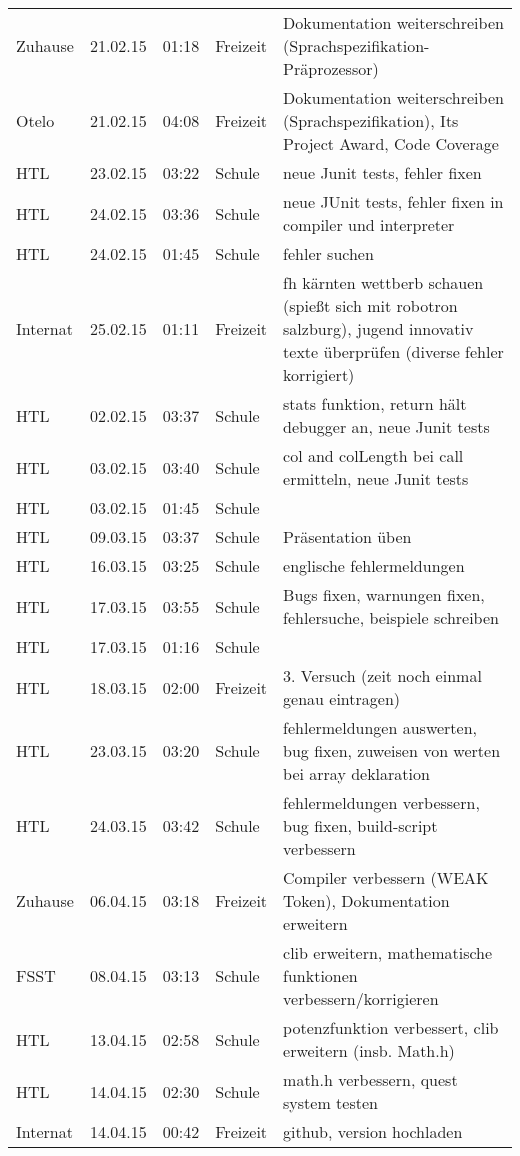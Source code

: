 \begin{small}
\begin{longtable}{ p{} p{} p{} p{} p{}}
Zuhause	& 21.02.15	& 01:18	& Freizeit	& Dokumentation weiterschreiben (Sprachspezifikation-Pr\"aprozessor) \\
Otelo	& 21.02.15	& 04:08	& Freizeit	& Dokumentation weiterschreiben (Sprachspezifikation), Its Project Award, Code Coverage \\
HTL	& 23.02.15	& 03:22	& Schule	& neue Junit tests, fehler fixen \\
HTL	& 24.02.15	& 03:36	& Schule	& neue JUnit tests, fehler fixen in compiler und interpreter \\
HTL	& 24.02.15	& 01:45	& Schule	& fehler suchen \\
Internat	& 25.02.15	& 01:11	& Freizeit	& fh k\"arnten wettberb schauen (spie\ss{}t sich mit robotron salzburg), jugend innovativ texte \"uberpr\"ufen (diverse fehler korrigiert) \\
HTL	& 02.02.15	& 03:37	& Schule	& stats funktion, return h\"alt debugger an, neue Junit tests \\
HTL	& 03.02.15	& 03:40	& Schule	& col and colLength bei call ermitteln, neue Junit tests \\
HTL	& 03.02.15	& 01:45	& Schule	&  \\
HTL	& 09.03.15	& 03:37	& Schule	& Pr\"asentation \"uben \\
HTL	& 16.03.15	& 03:25	& Schule	& englische fehlermeldungen \\
HTL	& 17.03.15	& 03:55	& Schule	& Bugs fixen, warnungen fixen, fehlersuche, beispiele schreiben \\
HTL	& 17.03.15	& 01:16	& Schule	&  \\
HTL	& 18.03.15	& 02:00	& Freizeit	& 3. Versuch (zeit noch einmal genau eintragen) \\
HTL	& 23.03.15	& 03:20	& Schule	& fehlermeldungen auswerten, bug fixen, zuweisen von werten bei array deklaration \\
HTL	& 24.03.15	& 03:42	& Schule	& fehlermeldungen verbessern, bug fixen, build-script verbessern \\
Zuhause	& 06.04.15	& 03:18	& Freizeit	& Compiler verbessern (WEAK Token), Dokumentation erweitern \\
FSST	& 08.04.15	& 03:13	& Schule	& clib erweitern, mathematische funktionen verbessern/korrigieren \\
HTL	& 13.04.15	& 02:58	& Schule	& potenzfunktion verbessert, clib erweitern (insb. Math.h) \\
HTL	& 14.04.15	& 02:30	& Schule	& math.h verbessern, quest system testen \\
Internat	& 14.04.15	& 00:42	& Freizeit	& github, version hochladen \\

\end{longtable}
\end{small}
